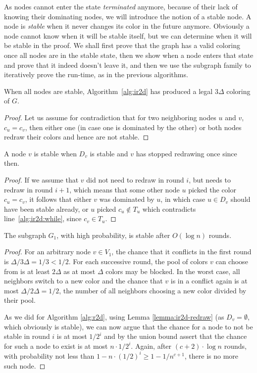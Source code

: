 As nodes cannot enter the state \textit{terminated} anymore, because of their lack of knowing their dominating nodes, we will introduce the notion of a stable node. A node is \textit{stable} when it never changes its color in the future anymore. Obviously a node cannot know when it will be stable itself, but we can determine when it will be stable in the proof. We shall first prove that the graph has a valid coloring once all nodes are in the stable state, then we show when a node enters that state and prove that it indeed doesn't leave it, and then we use the subgraph family to iteratively prove the run-time, as in the previous algorithms.

\begin{lemma}\label{lemma:ir2d-proof}
	When all nodes are stable, Algorithm~\ref{alg:ir2d} has produced a legal $3\Delta$ coloring of $G$.
\end{lemma}
\begin{proof}
	Let us assume for contradiction that for two neighboring nodes $u$ and $v$, $c_u = c_v$, then either one (in case one is dominated by the other) or both nodes redraw their colors and hence are not stable.
\end{proof}

\begin{lemma}\label{lemma:ir2d-redraw}
	A node $v$ is stable when $D_v$ is stable and $v$ has stopped redrawing once since then.
\end{lemma}
\begin{proof}
	If we assume that $v$ did not need to redraw in round $i$, but needs to redraw in round $i+1$, which means that some other node $u$ picked the color $c_u = c_v$, it follows that either $v$ was dominated by $u$, in which case $u \in D_v$ should have been stable already, or $u$ picked $c_u \notin T_u$ which contradicts line~\ref{alg:ir2d:while}, since $c_v \in T_u$.
\end{proof}

\begin{lemma}\label{lemma:ir2d-zeit}
	The subgraph $G_1$, with high probability, is stable after $O(\log n)$ rounds.
\end{lemma}
\begin{proof}
	For an arbitrary node $v \in V_1$, the chance that it conflicts in the first round is $\Delta / 3\Delta = 1/3 < 1/2$. For each successive round, the pool of colors $v$ can choose from is at least $2\Delta$ as at most $\Delta$ colors may be blocked. In the worst case, all neighbors switch to a new color and the chance that $v$ is in a conflict again is at most $\Delta / 2\Delta = 1/2$, the number of all neighbors choosing a new color divided by their pool.
	
	As we did for Algorithm \ref{alg:r2d}, using Lemma \ref{lemma:ir2d-redraw} (as $D_v = \emptyset$, which obviously is stable), we can now argue that the chance for a node to not be stable in round $i$ is at most $1/2^i$ and by the union bound assert that the chance for such a node to exist is at most $n \cdot 1/2^i$. Again, after $(c+2) \cdot \log n$ rounds, with probability not less than $1-n \cdot (1/2)^i \geq 1-1/n^{c+1}$, there is no more such node.
\end{proof}

